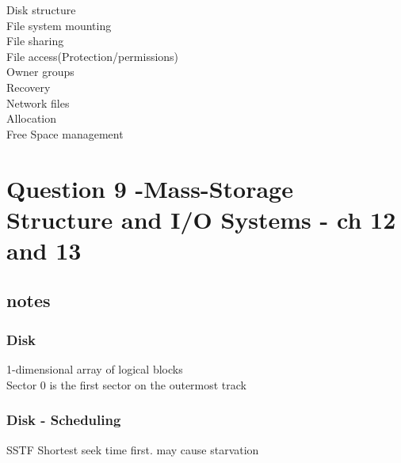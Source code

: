 \documentclass[a4paper,10pt,titlepage]{report}
\begin{document}
	
	
\vspace{5mm}
	
Disk structure\\


\vspace{5mm}
File system mounting \\


\vspace{5mm}
File sharing \\

\vspace{5mm}
File access(Protection/permissions)\\
\hspace{10mm} Owner groups\\

\vspace{5mm}
Recovery \\


\vspace{5mm}
Network files \\



\vspace{5mm}
Allocation \\


\vspace{5mm}
Free Space management \\

\hspace{10mm}



	




\section{Question 9 -Mass-Storage Structure and I/O Systems - ch 12 and 13 }

\subsection{notes}
\subsubsection{Disk}
1-dimensional array of logical blocks\\

Sector 0 is the first sector on the outermost track \\

\subsubsection{Disk - Scheduling}
SSTF
Shortest seek time first.
may cause starvation\\
\end{document}
